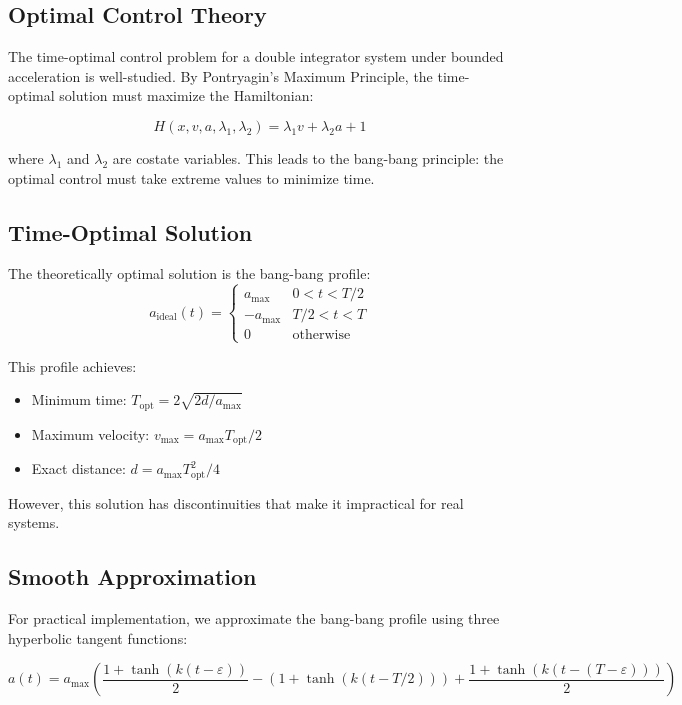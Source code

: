 \documentclass[12pt,a4paper]{article}
\begin{document}
\subsection{Optimal Control Theory}
The time-optimal control problem for a double integrator system under bounded acceleration is well-studied. By Pontryagin's Maximum Principle, the time-optimal solution must maximize the Hamiltonian:

\begin{equation}
H(x, v, a, \lambda_1, \lambda_2) = \lambda_1 v + \lambda_2 a + 1
\end{equation}

where $\lambda_1$ and $\lambda_2$ are costate variables. This leads to the bang-bang principle: the optimal control must take extreme values to minimize time.

\subsection{Time-Optimal Solution}
The theoretically optimal solution is the bang-bang profile:
\begin{equation}
a_{\text{ideal}}(t) = \begin{cases}
a_{\text{max}} & 0 < t < T/2 \\
-a_{\text{max}} & T/2 < t < T \\
0 & \text{otherwise}
\end{cases}
\end{equation}

This profile achieves:
\begin{itemize}
\item Minimum time: $T_{\text{opt}} = 2\sqrt{2d/a_{\text{max}}}$
\item Maximum velocity: $v_{\text{max}} = a_{\text{max}}T_{\text{opt}}/2$
\item Exact distance: $d = a_{\text{max}}T_{\text{opt}}^2/4$
\end{itemize}

However, this solution has discontinuities that make it impractical for real systems.

\subsection{Smooth Approximation}
For practical implementation, we approximate the bang-bang profile using three hyperbolic tangent functions:

\begin{equation}
a(t) = a_{\text{max}} \left(\frac{1 + \tanh(k(t - \varepsilon))}{2} - (1 + \tanh(k(t - T/2))) + \frac{1 + \tanh(k(t - (T-\varepsilon)))}{2}\right)
\end{equation}
\end{document}
